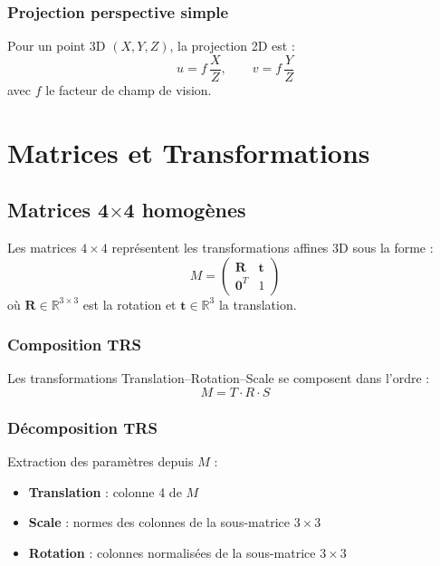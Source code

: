 \documentclass[11pt,a4paper]{article}
\begin{document}
\subsubsection{Projection perspective simple}

Pour un point 3D $(X, Y, Z)$, la projection 2D est :
\[
u = f\,\frac{X}{Z}, \qquad v = f\,\frac{Y}{Z}
\]
avec $f$ le facteur de champ de vision.

\newpage

\section{Matrices et Transformations}

\subsection{Matrices 4$\times$4 homogènes}

Les matrices $4 \times 4$ représentent les transformations affines 3D sous la forme :
\[
M = \begin{pmatrix} \mathbf{R} & \mathbf{t} \\ \mathbf{0}^T & 1 \end{pmatrix}
\]
où $\mathbf{R} \in \mathbb{R}^{3\times3}$ est la rotation et $\mathbf{t} \in \mathbb{R}^3$ la translation.

\subsubsection{Composition TRS}

Les transformations Translation–Rotation–Scale se composent dans l'ordre :
\[
M = T \cdot R \cdot S
\]

\subsubsection{Décomposition TRS}

Extraction des paramètres depuis $M$ :
\begin{itemize}[itemsep=2pt]
    \item \textbf{Translation} : colonne 4 de $M$
    \item \textbf{Scale} : normes des colonnes de la sous-matrice $3\times3$
    \item \textbf{Rotation} : colonnes normalisées de la sous-matrice $3\times3$
\end{itemize}
\end{document}
